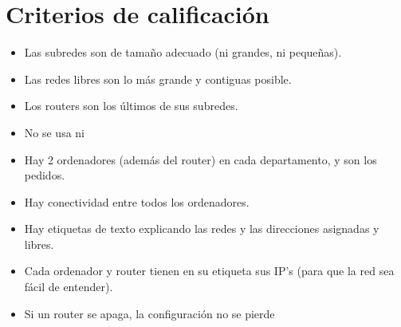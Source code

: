 \section{Criterios de calificación}
\begin{itemize}
\item Las subredes son de tamaño adecuado (ni grandes, ni pequeñas).
\item Las redes libres son lo más grande y contiguas posible.
\item Los routers son los últimos de sus subredes.
\item No se usa \texttt{} ni \texttt{}
\item Hay 2 ordenadores (además del router) en cada departamento, y son los pedidos.
\item Hay conectividad entre todos los ordenadores.
\item Hay etiquetas de texto explicando las redes y las direcciones asignadas y libres.
\item Cada ordenador y router tienen en su etiqueta sus IP’s (para que la red sea fácil de entender).
\item Si un router se apaga, la configuración no se pierde
\end{itemize}


\begin{comment}

  192.168.0.0/23

  Contabilidad /26 -> 64
  Informática /27 -> 32
  Administracion /28 -> 16
  Ventas /28 -> 16

  Libre /25
  Libre /24

\end{comment}


